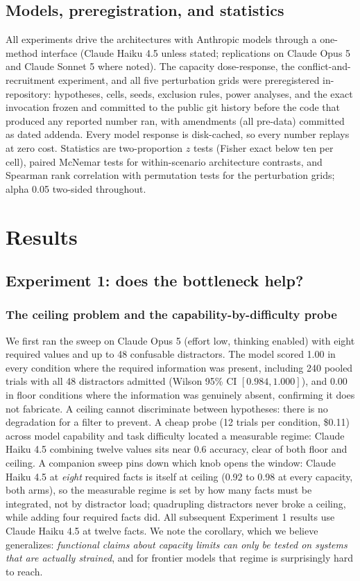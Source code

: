 \documentclass[11pt]{article}
\newcommand{\opus}{Claude Opus 5}
\newcommand{\haiku}{Claude Haiku 4.5}
\newcommand{\sonnet}{Claude Sonnet 5}
\begin{document}
\subsection{Models, preregistration, and statistics}

All experiments drive the architectures with Anthropic models through a
one-method interface (\haiku{} unless stated; replications on \opus{} and
\sonnet{} where noted). The capacity dose-response, the
conflict-and-recruitment experiment, and all five perturbation grids were
preregistered in-repository: hypotheses, cells, seeds, exclusion rules, power
analyses, and the exact invocation frozen and committed to the public git
history before the code that produced any reported number ran, with
amendments (all pre-data) committed as dated addenda. Every model response is
disk-cached, so every number replays at zero cost. Statistics are
two-proportion $z$ tests (Fisher exact below ten per cell), paired McNemar
tests for within-scenario architecture contrasts, and Spearman rank
correlation with permutation tests for the perturbation grids; alpha 0.05
two-sided throughout.

\section{Results}
\label{sec:results}

\subsection{Experiment 1: does the bottleneck help?}
\label{sec:exp1}

\subsubsection{The ceiling problem and the capability-by-difficulty probe}

We first ran the sweep on \opus{} (effort low, thinking enabled) with eight
required values and up to 48 confusable distractors. The model scored 1.00 in
every condition where the required information was present, including 240 pooled
trials with all 48 distractors admitted (Wilson 95\% CI $[0.984, 1.000]$), and
0.00 in floor conditions where the information was genuinely absent, confirming
it does not fabricate. A ceiling cannot discriminate between hypotheses: there is
no degradation for a filter to prevent. A cheap probe (12 trials per condition,
\$0.11) across model capability and task difficulty located a measurable regime:
\haiku{} combining twelve values sits near 0.6 accuracy, clear of both floor and
ceiling. A companion sweep pins down which knob opens the window: \haiku{} at
\emph{eight} required facts is itself at ceiling (0.92 to 0.98 at every
capacity, both arms), so the measurable regime is set by how many facts must be
integrated, not by distractor load; quadrupling distractors never broke a
ceiling, while adding four required facts did. All subsequent Experiment 1
results use \haiku{} at twelve facts. We note the corollary,
which we believe generalizes: \emph{functional claims about capacity limits can
only be tested on systems that are actually strained}, and for frontier models
that regime is surprisingly hard to reach.
\end{document}
